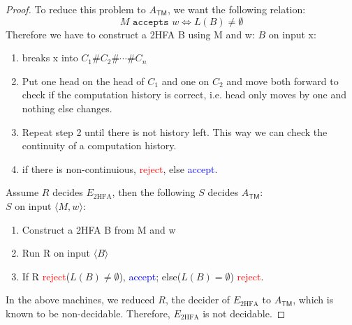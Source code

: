 \documentclass{article}
\newcommand{\TM}{\mathsf{TM}}
\newcommand{\accept}{\textcolor{blue}{accept}\xspace}
\newcommand{\reject}{\textcolor{red}{reject}\xspace}
\begin{document}
\begin{proof}
	To reduce this problem to $A_{\TM}$, we want the following relation:
	$$M \texttt{ accepts } w \Longleftrightarrow L(B) \ne \emptyset$$
	Therefore we have to construct a 2HFA B using M and w:
	$B$ on input x:
	\begin{enumerate}
		\item breaks x into $C_1\#C_2\# \cdots \#C_n$
		\item Put one head on the head of $C_1$ and one on $C_2$ and move both forward to check if the computation history is correct, i.e. head only moves by one and nothing else changes.
		\item Repeat step 2 until there is not history left. This way we can check the continuity of a computation history.
		\item if there is non-continuious, \reject, else \accept.
	\end{enumerate}
	Assume $R$ decides $E_{\text{2HFA}}$, then the following $S$ decides $A_{\TM}$: \\
	$S$ on input $\langle M, w \rangle$:
	\begin{enumerate}
		\item Construct a 2HFA B from M and w
		\item Run R on input $\langle B \rangle$
		\item If R \reject($L(B) \ne \emptyset$), \accept; else($L(B) = \emptyset$) \reject.
	\end{enumerate}

	In the above machines, we reduced $R$, the decider of $E_{\text{2HFA}}$ to $A_{\TM}$, which is known to be non-decidable. Therefore, $E_{\text{2HFA}}$ is not decidable.
\end{proof}
\end{document}
